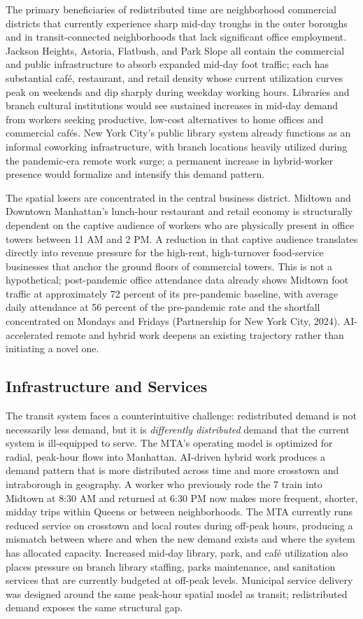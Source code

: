 \documentclass[10pt, twocolumn]{article}
\begin{document}
The primary beneficiaries of redistributed time are neighborhood commercial districts that currently experience sharp mid-day troughs in the outer boroughs and in transit-connected neighborhoods that lack significant office employment. Jackson Heights, Astoria, Flatbush, and Park Slope all contain the commercial and public infrastructure to absorb expanded mid-day foot traffic; each has substantial café, restaurant, and retail density whose current utilization curves peak on weekends and dip sharply during weekday working hours. Libraries and branch cultural institutions would see sustained increases in mid-day demand from workers seeking productive, low-cost alternatives to home offices and commercial cafés. New York City's public library system already functions as an informal coworking infrastructure, with branch locations heavily utilized during the pandemic-era remote work surge; a permanent increase in hybrid-worker presence would formalize and intensify this demand pattern.

The spatial losers are concentrated in the central business district. Midtown and Downtown Manhattan's lunch-hour restaurant and retail economy is structurally dependent on the captive audience of workers who are physically present in office towers between 11 AM and 2 PM. A reduction in that captive audience translates directly into revenue pressure for the high-rent, high-turnover food-service businesses that anchor the ground floors of commercial towers. This is not a hypothetical; post-pandemic office attendance data already shows Midtown foot traffic at approximately 72 percent of its pre-pandemic baseline, with average daily attendance at 56 percent of the pre-pandemic rate and the shortfall concentrated on Mondays and Fridays (Partnership for New York City, 2024). AI-accelerated remote and hybrid work deepens an existing trajectory rather than initiating a novel one.

\subsection*{Infrastructure and Services}

The transit system faces a counterintuitive challenge: redistributed demand is not necessarily less demand, but it is \textit{differently distributed} demand that the current system is ill-equipped to serve. The MTA's operating model is optimized for radial, peak-hour flows into Manhattan. AI-driven hybrid work produces a demand pattern that is more distributed across time and more crosstown and intraborough in geography. A worker who previously rode the 7 train into Midtown at 8:30 AM and returned at 6:30 PM now makes more frequent, shorter, midday trips within Queens or between neighborhoods. The MTA currently runs reduced service on crosstown and local routes during off-peak hours, producing a mismatch between where and when the new demand exists and where the system has allocated capacity. Increased mid-day library, park, and café utilization also places pressure on branch library staffing, parks maintenance, and sanitation services that are currently budgeted at off-peak levels. Municipal service delivery was designed around the same peak-hour spatial model as transit; redistributed demand exposes the same structural gap.
\end{document}
